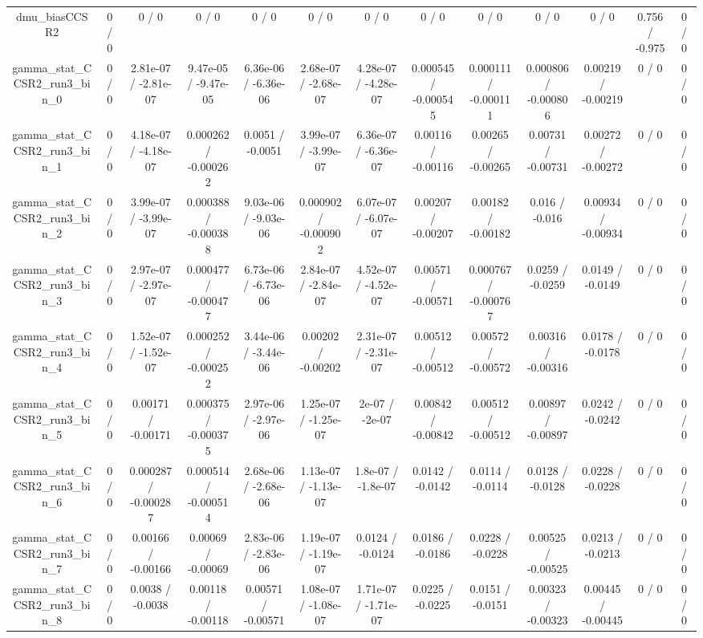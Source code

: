 \documentclass[10pt]{article}
\begin{document}
\begin{table}[htbp]
\begin{center}
\begin{tabular}{|c|c|c|c|c|c|c|c|c|c|c|c|c|}
  dmu_biasCCSR2 & 0 / 0 & 0 / 0 & 0 / 0 & 0 / 0 & 0 / 0 & 0 / 0 & 0 / 0 & 0 / 0 & 0 / 0 & 0 / 0 & 0.756 / -0.975 & 0 / 0 \\ 
  gamma_stat_CCSR2_run3_bin_0 & 0 / 0 & 2.81e-07 / -2.81e-07 & 9.47e-05 / -9.47e-05 & 6.36e-06 / -6.36e-06 & 2.68e-07 / -2.68e-07 & 4.28e-07 / -4.28e-07 & 0.000545 / -0.000545 & 0.000111 / -0.000111 & 0.000806 / -0.000806 & 0.00219 / -0.00219 & 0 / 0 & 0 / 0 \\ 
  gamma_stat_CCSR2_run3_bin_1 & 0 / 0 & 4.18e-07 / -4.18e-07 & 0.000262 / -0.000262 & 0.0051 / -0.0051 & 3.99e-07 / -3.99e-07 & 6.36e-07 / -6.36e-07 & 0.00116 / -0.00116 & 0.00265 / -0.00265 & 0.00731 / -0.00731 & 0.00272 / -0.00272 & 0 / 0 & 0 / 0 \\ 
  gamma_stat_CCSR2_run3_bin_2 & 0 / 0 & 3.99e-07 / -3.99e-07 & 0.000388 / -0.000388 & 9.03e-06 / -9.03e-06 & 0.000902 / -0.000902 & 6.07e-07 / -6.07e-07 & 0.00207 / -0.00207 & 0.00182 / -0.00182 & 0.016 / -0.016 & 0.00934 / -0.00934 & 0 / 0 & 0 / 0 \\ 
  gamma_stat_CCSR2_run3_bin_3 & 0 / 0 & 2.97e-07 / -2.97e-07 & 0.000477 / -0.000477 & 6.73e-06 / -6.73e-06 & 2.84e-07 / -2.84e-07 & 4.52e-07 / -4.52e-07 & 0.00571 / -0.00571 & 0.000767 / -0.000767 & 0.0259 / -0.0259 & 0.0149 / -0.0149 & 0 / 0 & 0 / 0 \\ 
  gamma_stat_CCSR2_run3_bin_4 & 0 / 0 & 1.52e-07 / -1.52e-07 & 0.000252 / -0.000252 & 3.44e-06 / -3.44e-06 & 0.00202 / -0.00202 & 2.31e-07 / -2.31e-07 & 0.00512 / -0.00512 & 0.00572 / -0.00572 & 0.00316 / -0.00316 & 0.0178 / -0.0178 & 0 / 0 & 0 / 0 \\ 
  gamma_stat_CCSR2_run3_bin_5 & 0 / 0 & 0.00171 / -0.00171 & 0.000375 / -0.000375 & 2.97e-06 / -2.97e-06 & 1.25e-07 / -1.25e-07 & 2e-07 / -2e-07 & 0.00842 / -0.00842 & 0.00512 / -0.00512 & 0.00897 / -0.00897 & 0.0242 / -0.0242 & 0 / 0 & 0 / 0 \\ 
  gamma_stat_CCSR2_run3_bin_6 & 0 / 0 & 0.000287 / -0.000287 & 0.000514 / -0.000514 & 2.68e-06 / -2.68e-06 & 1.13e-07 / -1.13e-07 & 1.8e-07 / -1.8e-07 & 0.0142 / -0.0142 & 0.0114 / -0.0114 & 0.0128 / -0.0128 & 0.0228 / -0.0228 & 0 / 0 & 0 / 0 \\ 
  gamma_stat_CCSR2_run3_bin_7 & 0 / 0 & 0.00166 / -0.00166 & 0.00069 / -0.00069 & 2.83e-06 / -2.83e-06 & 1.19e-07 / -1.19e-07 & 0.0124 / -0.0124 & 0.0186 / -0.0186 & 0.0228 / -0.0228 & 0.00525 / -0.00525 & 0.0213 / -0.0213 & 0 / 0 & 0 / 0 \\ 
  gamma_stat_CCSR2_run3_bin_8 & 0 / 0 & 0.0038 / -0.0038 & 0.00118 / -0.00118 & 0.00571 / -0.00571 & 1.08e-07 / -1.08e-07 & 1.71e-07 / -1.71e-07 & 0.0225 / -0.0225 & 0.0151 / -0.0151 & 0.00323 / -0.00323 & 0.00445 / -0.00445 & 0 / 0 & 0 / 0 \\ 

\end{tabular}
\end{center}
\end{table}
\end{document}
